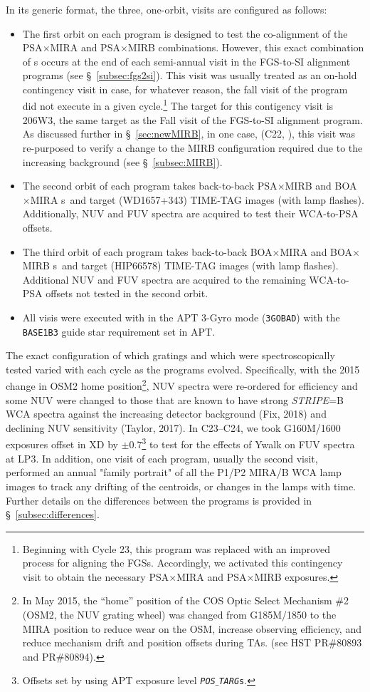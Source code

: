 In its generic format, the three, one-orbit, visits are configured as follows:
\begin{itemize}
	\item{The first orbit on each program is designed to test the co-alignment of the PSA$\times$MIRA and PSA$\times$MIRB  combinations.
However, this exact combination of s occurs at the end of each semi-annual visit in the FGS-to-SI alignment programs (see \S~\ref{subsec:fgs2si}).
This visit was usually treated as an on-hold contingency visit in case, for whatever reason, the fall visit of the program did not execute in a given cycle.\footnote{Beginning with Cycle 23, this program
was replaced with an improved process for aligning the FGSs. Accordingly,  we activated this contingency visit to obtain the necessary PSA$\times$MIRA and PSA$\times$MIRB exposures.}
The target for this contigency visit is 206W3, the same target as the Fall visit of the FGS-to-SI alignment program.
As discussed further in \S~\ref{sec:newMIRB}, in one case, (C22, ), this visit was re-purposed to verify a change to the MIRB configuration required due to the increasing background (see \S~\ref{subsec:MIRB}).}
	\item{The second orbit of each program takes back-to-back PSA$\times$MIRB and BOA$\times$MIRA s~and target (WD1657+343) TIME-TAG images (with lamp flashes).
	Additionally, NUV and FUV spectra are acquired to test their WCA-to-PSA offsets.}
	\item{The third orbit of each program takes back-to-back BOA$\times$MIRA and BOA$\times$MIRB s~and target (HIP66578) TIME-TAG images (with lamp flashes). Additional NUV and FUV spectra are acquired to the remaining WCA-to-PSA offsets not tested in the second orbit.}
	\item{All visis were executed with in the APT 3-Gyro mode (\texttt{3GOBAD}) with the \texttt{BASE1B3} guide star requirement set in APT.}
\end{itemize}
The exact configuration of which gratings and which \cenwaves were spectroscopically tested varied with each cycle as the programs evolved.
Specifically, with the 2015 change in OSM2 home position\footnote{In May 2015, the ``home'' position of the COS Optic Select Mechanism \#2 (OSM2, the NUV grating wheel) was changed from G185M/1850 to the MIRA position to reduce wear on the OSM, increase observing efficiency, and reduce mechanism drift and position offsets during  TAs. (see HST PR\#80893 and PR\#80894).}, NUV spectra were re-ordered for efficiency and some NUV \cenwaves were changed to those
that are known to have strong \textit{STRIPE}=B WCA spectra against the increasing detector background (Fix, 2018) and declining NUV sensitivity (Taylor, 2017).
In C23--C24, we took G160M/1600 exposures offset in XD by $\pm 0.7$\arcsec\footnote{Offsets set by using APT exposure level \texttt{{\it POS$\_$TARG}s}.} to test for the effects of Ywalk on FUV spectra at LP3.
In addition, one visit of each program, usually the second visit, performed an annual "family portrait"  of all the P1/P2 MIRA/B WCA lamp images to track any drifting of the centroids, or changes in the lamps with time.
Further details on the differences between the programs is provided in \S~\ref{subsec:differences}.
